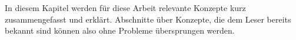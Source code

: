 In diesem Kapitel werden für diese Arbeit relevante Konzepte kurz zusammengefasst und erklärt.
Abschnitte über Konzepte, die dem Leser bereits bekannt sind können also ohne Probleme übersprungen werden.